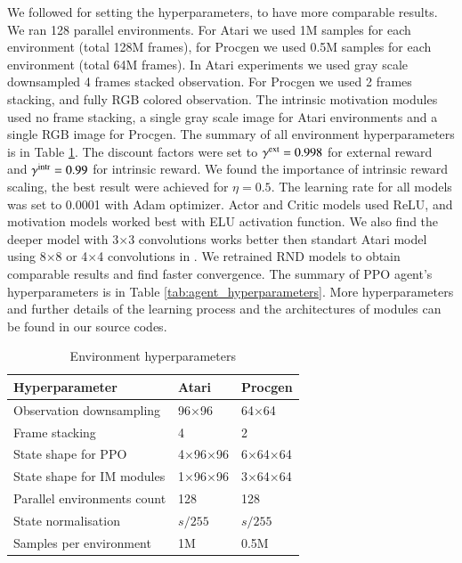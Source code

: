 \documentclass[a4paper,11pt]{elsarticle}
\begin{document}
We followed \citep{burda2018exploration} for setting the hyperparameters, to have more comparable results. We ran 128 parallel environments.
For Atari we used 1M samples for each environment  (total 128M frames), for Procgen we used 0.5M samples for each environment (total 64M frames). 
In Atari experiments we used gray scale downsampled 4 frames stacked observation. 
For Procgen we used 2 frames stacking, and fully RGB colored observation. The intrinsic motivation modules used no frame stacking, a single gray scale image for Atari  environments and a single RGB image for Procgen.
The summary of all environment hyperparameters is in Table \ref{tab:env_hyperparameters}.
The discount factors were set to $\gamma^{\rm ext} = 0.998$ for external reward and $\gamma^{\rm intr} = 0.99$ for intrinsic reward.
We found the importance of intrinsic reward scaling, the best result were achieved for $\eta = 0.5$.
The learning rate for all models was set to 0.0001 with Adam optimizer. Actor and Critic models used ReLU, and motivation models worked best with ELU activation function. We also find the deeper model with 3$\times$3 convolutions works better then standart Atari model using 8$\times$8 or 4$\times$4 convolutions in \citep{mnih2013playing}. We retrained RND models to obtain comparable results and find faster convergence. The summary of PPO agent's hyperparameters is in Table \ref{tab:agent_hyperparameters}.
More hyperparameters and further details of the learning process and the architectures of modules can be found in our source codes.

\begin{table}[thb]
\scriptsize
\centering
\caption{Environment hyperparameters}
    \begin{tabular}{l|ll}
        Hyperparameter & Atari & Procgen  \\ 
        \hline\hline
        Observation downsampling & 96$\times$96 & 64$\times$64 \\
        Frame stacking & 4 & 2 \\
        State shape for PPO & 4$\times$96$\times$96 & 6$\times$64$\times$64 \\
        State shape for IM modules & 1$\times$96$\times$96 & 3$\times$64$\times$64 \\
        Parallel environments count & 128 & 128 \\
        State normalisation & $s/255$ & $s/255$ \\
        Samples per environment & 1M & 0.5M \\
        \hline
    \end{tabular}
    \label{tab:env_hyperparameters}
\end{table}
\end{document}
